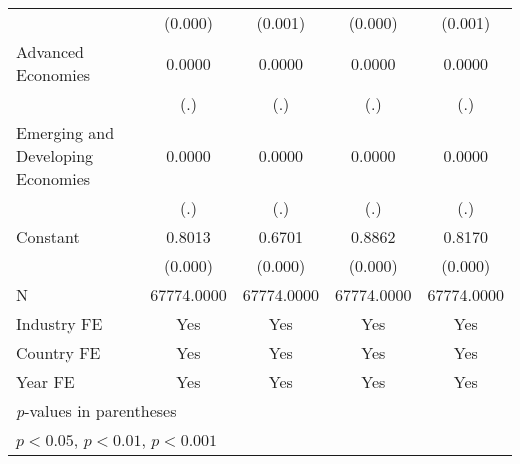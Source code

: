 {\begin{tabular}{l*{4}{c}}
                    &     (0.000)         &     (0.001)         &     (0.000)         &     (0.001)         \\
Advanced Economies  &      0.0000         &      0.0000         &      0.0000         &      0.0000         \\
                    &         (.)         &         (.)         &         (.)         &         (.)         \\
Emerging and Developing Economies&      0.0000         &      0.0000         &      0.0000         &      0.0000         \\
                    &         (.)         &         (.)         &         (.)         &         (.)         \\
Constant            &      0.8013\sym{***}&      0.6701\sym{***}&      0.8862\sym{***}&      0.8170\sym{***}\\
                    &     (0.000)         &     (0.000)         &     (0.000)         &     (0.000)         \\
\hline
N                   &  67774.0000         &  67774.0000         &  67774.0000         &  67774.0000         \\
Industry FE         &         Yes         &         Yes         &         Yes         &         Yes         \\
Country FE          &         Yes         &         Yes         &         Yes         &         Yes         \\
Year FE             &         Yes         &         Yes         &         Yes         &         Yes         \\
\hline\hline
\multicolumn{5}{l}{\footnotesize \textit{p}-values in parentheses}\\
\multicolumn{5}{l}{\footnotesize \sym{*} \(p<0.05\), \sym{**} \(p<0.01\), \sym{***} \(p<0.001\)}\\
\end{tabular}
}

